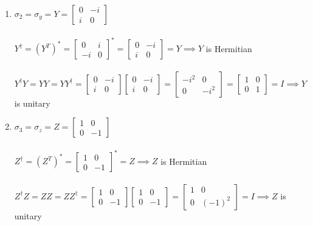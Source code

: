 \documentclass{article}
\begin{document}
\begin{framed}
\begin{enumerate}
        \item $\sigma_2=\sigma_y=Y = \begin{bmatrix} 0 & -i \\ i & 0 \end{bmatrix}$\\\\
        $Y^{\dagger} = (Y^{T})^* = \begin{bmatrix} 0 & i \\ -i & 0 \end{bmatrix}^{*} = \begin{bmatrix} 0 & -i \\ i & 0 \end{bmatrix} = Y \implies Y$ is Hermitian\\\\
        $Y^{\dagger}Y = YY = YY^{\dagger} = \begin{bmatrix} 0 & -i \\ i & 0 \end{bmatrix}\begin{bmatrix} 0 & -i \\ i & 0 \end{bmatrix}=\begin{bmatrix} -i^2 & 0 \\ 0 & -i^2 \end{bmatrix}=\begin{bmatrix} 1 & 0 \\ 0 & 1 \end{bmatrix} = I \implies Y$ is unitary

        \item $\sigma_3=\sigma_z=Z = \begin{bmatrix} 1 & 0 \\ 0 & -1 \end{bmatrix}$\\\\
        $Z^{\dagger} = (Z^{T})^{*} = \begin{bmatrix} 1 & 0 \\ 0 & -1 \end{bmatrix}^{*} = Z \implies Z$ is Hermitian\\\\
        $Z^{\dagger}Z = ZZ = ZZ^{\dagger} = \begin{bmatrix} 1 & 0 \\ 0 & -1 \end{bmatrix}\begin{bmatrix} 1 & 0 \\ 0 & -1 \end{bmatrix}=\begin{bmatrix} 1 & 0 \\ 0 & (-1)^2 \end{bmatrix}=I \implies Z$ is unitary
    \end{enumerate}
    
\end{framed}
\end{document}
